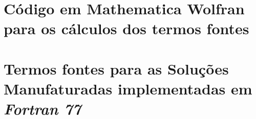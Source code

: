 \documentclass[doutorado, pos-defesa]{packages/icmc}
\begin{document}

%
\printglossaries
\begin{apendicesenv}
   \chapter{Código em Mathematica Wolfran para os cálculos dos termos fontes}\label{chapter:mathematica_wolfran}
   
   \chapter{Termos fontes para as Soluções Manufaturadas implementadas em \textit{Fortran 77}}\label{chapter:fortran_77}
   
\end{apendicesenv}
%    
\end{document}

